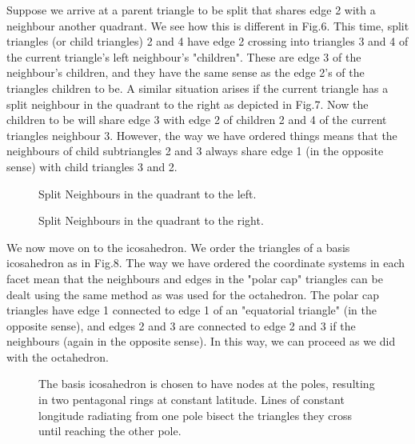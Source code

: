 \documentclass[12pt]{article}
\begin{document}
Suppose we arrive at a parent triangle to be split that shares edge 2 with a neighbour 
another quadrant. We see how this is different in Fig.6. This time, split 
triangles (or child triangles)
 2 and 4  have edge 2 crossing
into  triangles 3 and 4 of the  current triangle's left neighbour's
 "children". These
 are edge 3 of the neighbour's children, and they have the same sense as
the edge 2's of the triangles children  to be.
A similar situation arises if the current triangle has a split neighbour in the 
quadrant to the right as depicted in Fig.7. Now the children to be will share edge 3 with
 edge 2 of children 2 and 4 of the current triangles neighbour 3.
However, the way we have ordered things means that the neighbours of child subtriangles
2 and 3 always share edge 1 (in the opposite sense) with child triangles 3 and 2.

\vspace*{10cm}
\begin{figure}[htb]
\caption{ 
Split Neighbours in the  quadrant to the left.
}
\end{figure}

\vspace*{10cm}
\begin{figure}[htb]
\caption{ 
Split Neighbours in the  quadrant to the right.
}
\end{figure}

We now move on to the icosahedron.
We order the triangles of a basis icosahedron as in Fig.8. The way
we have ordered the coordinate systems in each facet mean that the
neighbours and edges in the 
"polar cap" triangles can be dealt using the same method as was used for
the octahedron. The polar cap triangles have edge 1 connected to edge
 1 of an "equatorial triangle" (in the opposite sense), and edges 2 and 3 
are connected to edge 2 and 3 if the neighbours (again in the opposite 
sense). In this way, we can proceed as we did with the octahedron.


\vspace*{10cm}
\begin{figure}[htb]
\caption{ 
The basis icosahedron is chosen to have nodes at the poles, resulting
in two pentagonal rings at constant latitude. Lines of constant longitude
 radiating from one pole bisect the triangles they cross until
reaching the other pole.
}
\end{figure}
\end{document}
